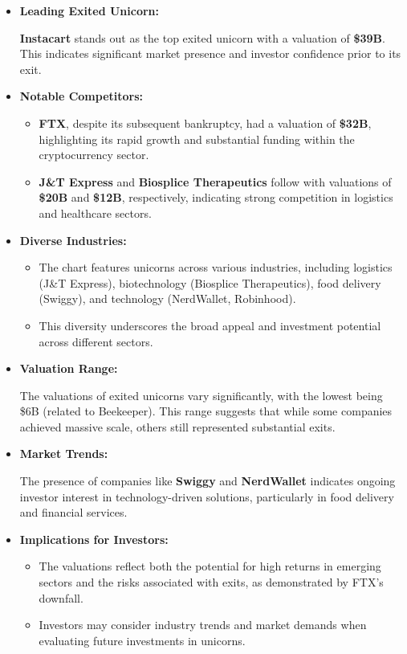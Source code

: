 \documentclass[a4paper,12pt]{article}
\begin{document}
\begin{itemize}
\item \textbf{Leading Exited Unicorn:}

\textbf{Instacart} stands out as the top exited unicorn with a valuation of \textbf{\$39B}. This indicates significant market presence and investor confidence prior to its exit.

\item \textbf{Notable Competitors:}

\begin{itemize}
\item \textbf{FTX}, despite its subsequent bankruptcy, had a valuation of \textbf{\$32B}, highlighting its rapid growth and substantial funding within the cryptocurrency sector.
\item \textbf{J\&T Express} and \textbf{Biosplice Therapeutics} follow with valuations of \textbf{\$20B} and \textbf{\$12B}, respectively, indicating strong competition in logistics and healthcare sectors.
\end{itemize}

\item \textbf{Diverse Industries:}

\begin{itemize}
\item The chart features unicorns across various industries, including logistics (J\&T Express), biotechnology (Biosplice Therapeutics), food delivery (Swiggy), and technology (NerdWallet, Robinhood).
\item This diversity underscores the broad appeal and investment potential across different sectors.
\end{itemize}

\item \textbf{Valuation Range:}

The valuations of exited unicorns vary significantly, with the lowest being \$6B (related to Beekeeper). This range suggests that while some companies achieved massive scale, others still represented substantial exits.

\item \textbf{Market Trends:}

The presence of companies like \textbf{Swiggy} and \textbf{NerdWallet} indicates ongoing investor interest in technology-driven solutions, particularly in food delivery and financial services.

\item \textbf{Implications for Investors:}

\begin{itemize}
\item The valuations reflect both the potential for high returns in emerging sectors and the risks associated with exits, as demonstrated by FTX's downfall.
\item Investors may consider industry trends and market demands when evaluating future investments in unicorns.
\end{itemize}
\end{itemize}
\end{document}
